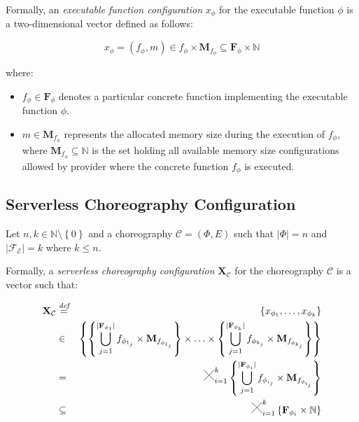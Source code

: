 \documentclass[10pt,a4paper]{report}
\newcommand{\Cross}{\mathbin{\tikz [x=2.5ex,y=2.5ex,line width=.10ex] \draw (0,0) -- (1,1) (0,1) -- (1,0);}}
\newcommand*{\N}{\mathbb{N}}
\newcommand{\mathDef}{\overset{\textit{def}}{=}}
\theoremstyle{definition}
\begin{document}
Formally, an \textit{executable function configuration} $x_{\phi}$ for the executable function $\phi$ is a two-dimensional vector defined as follows:

\begin{equation}
	x_{\phi} = (f_{\phi},m) \in f_{\phi} \times \textbf{M}_{f_{\phi}} \subseteq \textbf{F}_{\phi} \times \N
\end{equation}

where:

\begin{itemize}
	\item $f_{\phi} \in \textbf{F}_{\phi}$  denotes a particular concrete function implementing the executable function $\phi$.
	\item $m \in \textbf{M}_{f_{\phi}}$ represents the allocated memory size during the execution of $f_{\phi}$, where $\textbf{M}_{f_{\phi}} \subseteq \N$ is the set holding all available memory size configurations allowed by provider where the concrete function $f_{\phi}$ is executed.
\end{itemize}

\subsection{Serverless Choreography Configuration}

Let $n,k \in \N \setminus \left\lbrace 0 \right\rbrace$ and a choreography $\mathcal{C} = (\Phi,E)$ such that $|\Phi| = n$ and $|\mathscr{F_E}| = k$ where $k \leq n$.

Formally, a \textit{serverless choreography configuration} $\textbf{X}_{\mathcal{C}}$ for the choreography $\mathcal{C}$ is a vector such that:

\begin{eqnarray}
	\textbf{X}_{\mathcal{C}} & \mathDef & \left\lbrace x_{\phi_{1}}, \ldots, x_{\phi_{k}} \right\rbrace \nonumber \\ 
	& \in & \left\{  \left\{ \bigcup_{j=1}^{|\textbf{F}_{\phi_{1}}|} f_{\phi_{1_j}} \times \textbf{M}_{f_{\phi_{1_j}}} \right\} \times \ldots \times \left\{ \bigcup_{j=1}^{|\textbf{F}_{\phi_{k}}|} f_{\phi_{k_j}} \times \textbf{M}_{f_{\phi_{k_j}}} \right\} \right\}  \nonumber \\
	& = & \Cross_{i = 1}^k \left\{ \bigcup_{j=1}^{|\textbf{F}_{\phi_{i}}|} f_{\phi_{i_j}} \times \textbf{M}_{f_{\phi_{i_j}}} \right\} \nonumber \\
	& \subseteq & \Cross_{i = 1}^k \left\{ \textbf{F}_{\phi_{i}} \times \mathbb{N} \right\}
\end{eqnarray}
\end{document}
